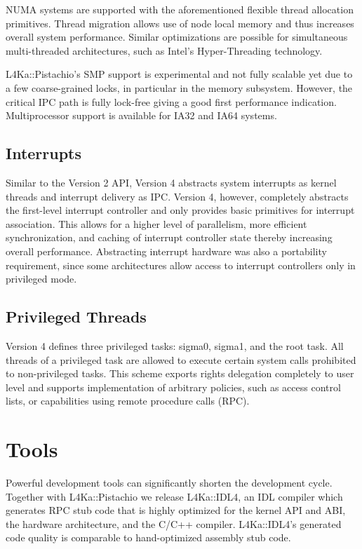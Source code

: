 \documentclass[twoside]{whitepaper}
\newcommand{\Pistachio}{L4Ka::Pistachio\xspace}
\newcommand{\IDL}{L4Ka::IDL4\xspace}
\begin{document}
NUMA systems are supported with the aforementioned flexible thread
allocation primitives.  Thread migration allows use of node local
memory and thus increases overall system performance.  Similar
optimizations are possible for simultaneous multi-threaded
architectures, such as Intel's Hyper-Threading technology.

\Pistachio's SMP support is experimental and not fully scalable yet due
to a few coarse-grained locks, in particular in the memory subsystem.
However, the critical IPC path is fully lock-free giving a good first
performance indication.  Multiprocessor support is available for IA32
and IA64 systems.

\subsection{Interrupts}
Similar to the Version 2 API, Version 4 abstracts system interrupts as kernel
threads and interrupt delivery as IPC.  Version 4, however, completely
abstracts the first-level interrupt controller and only provides basic primitives
for interrupt association.  This allows for a higher level of parallelism, more efficient
synchronization, and caching of interrupt controller state thereby
increasing overall performance.  Abstracting interrupt hardware was
also a portability requirement, since some architectures allow access
to interrupt controllers only in privileged mode.

\subsection{Privileged Threads}
Version 4 defines three privileged tasks: sigma0, sigma1, and the root
task.  All threads of a privileged task are allowed to execute certain
system calls prohibited to non-privileged tasks.  This
scheme exports rights delegation completely to user level and
supports implementation of arbitrary policies, such as access control
lists, or capabilities using remote procedure calls (RPC).


\section{Tools}
Powerful development tools can significantly shorten the development
cycle.  Together with \Pistachio we release \IDL, an IDL compiler
which generates RPC stub code that is highly optimized for the kernel API and ABI,
the hardware architecture, and the C/C++ compiler.  \IDL's generated code
quality is comparable to hand-optimized assembly stub code.
\end{document}

